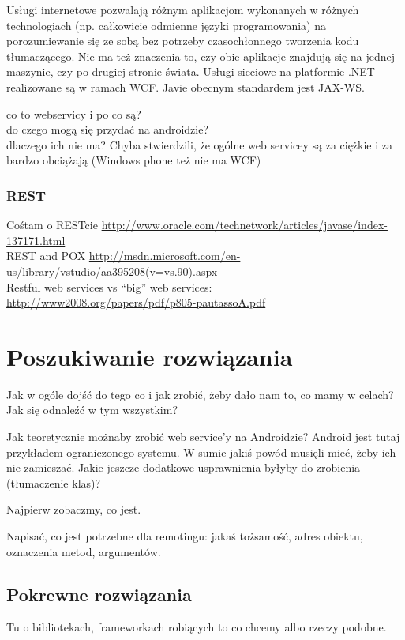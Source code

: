 \documentclass[twoside,a4paper]{book}
\begin{document}
Usługi internetowe pozwalają różnym aplikacjom wykonanych w różnych technologiach (np. całkowicie odmienne języki programowania) na porozumiewanie się ze sobą bez potrzeby czasochłonnego tworzenia kodu tłumaczącego. Nie ma też znaczenia to, czy obie aplikacje znajdują się na jednej maszynie, czy po drugiej stronie świata.
Usługi sieciowe na platformie .NET realizowane są w ramach WCF. Javie obecnym standardem jest JAX-WS.

co to webservicy i po co są?\\
do czego mogą się przydać na androidzie?\\
dlaczego ich nie ma? Chyba stwierdzili, że ogólne web servicey są za ciężkie i za bardzo obciążają (Windows phone też nie ma WCF)\\

\subsection{REST}
Cośtam o RESTcie \url{http://www.oracle.com/technetwork/articles/javase/index-137171.html}\\
REST and POX \url{http://msdn.microsoft.com/en-us/library/vstudio/aa395208(v=vs.90).aspx}\\

Restful web services vs ``big'' web services: \url{http://www2008.org/papers/pdf/p805-pautassoA.pdf}\\

\chapter{Poszukiwanie rozwiązania}
Jak w ogóle dojść do tego  co i jak zrobić, żeby dało nam to, co mamy w celach? Jak się odnaleźć w tym wszystkim?

Jak teoretycznie możnaby zrobić web service'y na Androidzie? Android jest tutaj przykładem ograniczonego systemu.
W sumie jakiś powód musięli mieć, żeby ich nie zamieszać. Jakie jeszcze dodatkowe usprawnienia byłyby do zrobienia (tłumaczenie klas)?

Najpierw zobaczmy, co jest.

Napisać, co jest potrzebne dla remotingu: jakaś tożsamość, adres obiektu, oznaczenia metod, argumentów.

\section{Pokrewne rozwiązania}
Tu o bibliotekach, frameworkach robiących to co chcemy albo rzeczy podobne.
\end{document}
